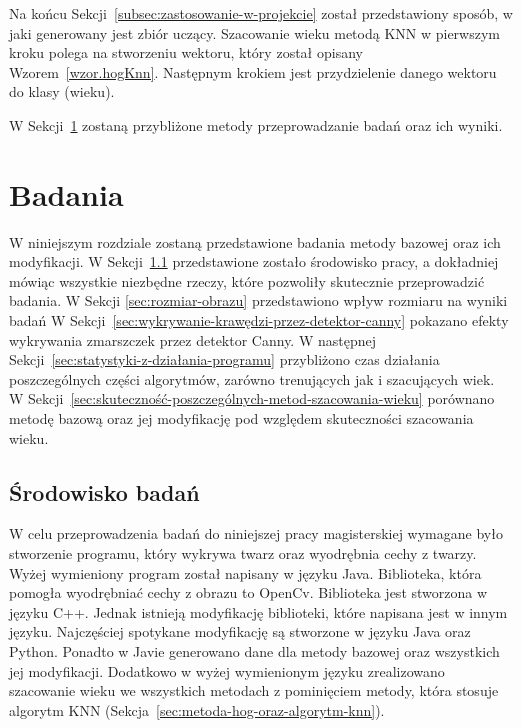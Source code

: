 \documentclass[a4paper,twoside,12pt]{book}
\begin{document}
    Na końcu Sekcji~\ref{subsec:zastosowanie-w-projekcie} został przedstawiony sposób, w jaki generowany jest zbiór
    uczący.
    Szacowanie wieku metodą KNN w pierwszym kroku polega na stworzeniu wektoru, który został opisany
    Wzorem~\ref{wzor.hogKnn}.
    Następnym krokiem jest przydzielenie danego wektoru do klasy (wieku).

    W Sekcji~\ref{ch:badania} zostaną przybliżone metody przeprowadzanie badań oraz ich wyniki.

    \chapter{Badania}\label{ch:badania}
    W niniejszym rozdziale zostaną przedstawione badania metody bazowej oraz ich modyfikacji.
    W Sekcji~\ref{sec:środowisko-pracy} przedstawione zostało środowisko pracy, a dokładniej mówiąc wszystkie
    niezbędne rzeczy, które pozwoliły skutecznie przeprowadzić badania.
    W Sekcji \ref{sec:rozmiar-obrazu} przedstawiono wpływ rozmiaru na wyniki badań
    W Sekcji~\ref{sec:wykrywanie-krawędzi-przez-detektor-canny} pokazano efekty wykrywania zmarszczek przez detektor
    Canny. W następnej Sekcji~\ref{sec:statystyki-z-działania-programu} przybliżono czas działania poszczególnych
    części algorytmów, zarówno trenujących jak i szacujących wiek.
    W Sekcji~\ref{sec:skuteczność-poszczególnych-metod-szacowania-wieku} porównano metodę bazową oraz jej modyfikację
    pod względem skuteczności szacowania wieku.

    \section{Środowisko badań}\label{sec:środowisko-pracy}

    W celu przeprowadzenia badań do niniejszej pracy magisterskiej wymagane było stworzenie programu,
    który wykrywa twarz oraz wyodrębnia cechy z twarzy. Wyżej wymieniony program został napisany w języku Java.
    Biblioteka, która pomogła wyodrębniać cechy z obrazu to OpenCv. Biblioteka jest stworzona w języku C++. Jednak
    istnieją modyfikację biblioteki, które napisana jest w innym języku. Najczęściej spotykane modyfikację są
    stworzone w języku Java oraz Python. Ponadto w Javie generowano dane dla metody bazowej oraz wszystkich
    jej modyfikacji. Dodatkowo w wyżej wymienionym języku zrealizowano szacowanie wieku we wszystkich metodach z
    pominięciem metody, która stosuje algorytm KNN (Sekcja~\ref{sec:metoda-hog-oraz-algorytm-knn}).
\end{document}
